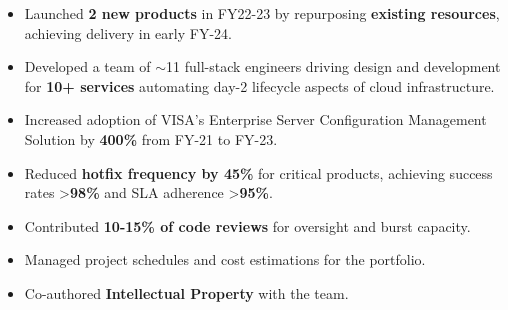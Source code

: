 \begin{itemize}
    \item Launched \textbf{2 new products} in FY22-23 by repurposing \textbf{existing resources}, achieving delivery in early FY-24.
    \item Developed a team of \(\sim\)11 full-stack engineers driving design and development for \textbf{10+ services} automating day-2 lifecycle aspects of cloud infrastructure.
    \item Increased adoption of VISA's Enterprise Server Configuration Management Solution by \textbf{400\%} from FY-21 to FY-23.
    \item Reduced \textbf{hotfix frequency by 45\%} for critical products, achieving success rates >\textbf{98\%} and SLA adherence >\textbf{95\%}.
    \item Contributed \textbf{10-15\% of code reviews} for oversight and burst capacity.
    \item Managed project schedules and cost estimations for the portfolio.
    \item Co-authored \textbf{Intellectual Property} with the team.
\end{itemize}
